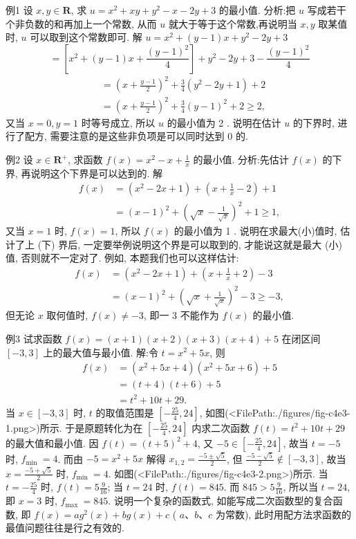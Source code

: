 例1 设 $x, y \in \mathbf{R}$, 求 $u=x^2+x y+y^2-x-2 y+3$ 的最小值.
分析:把 $u$ 写成若干个非负数的和再加上一个常数, 从而 $u$ 就大于等于这个常数,再说明当 $x, y$ 取某值时, $u$ 可以取到这个常数即可.
解 $u=x^2+(y-1) x+y^2-2 y+3$
$$
=\left[x^2+(y-1) x+\frac{(y-1)^2}{4}\right]+y^2-2 y+3-\frac{(y-1)^2}{4}
$$
$$
\begin{aligned}
& =\left(x+\frac{y-1}{2}\right)^2+\frac{3}{4}\left(y^2-2 y+1\right)+2 \\
& =\left(x+\frac{y-1}{2}\right)^2+\frac{3}{4}(y-1)^2+2 \geqslant 2,
\end{aligned}
$$
又当 $x=0, y=1$ 时等号成立, 所以 $u$ 的最小值为 2 .
说明在估计 $u$ 的下界时, 进行了配方, 需要注意的是这些非负项是可以同时达到 0 的.



例2 设 $x \in \mathbf{R}^{+}$, 求函数 $f(x)=x^2-x+\frac{1}{x}$ 的最小值.
分析:先估计 $f(x)$ 的下界, 再说明这个下界是可以达到的.
解
$$
\begin{aligned}
f(x) & =\left(x^2-2 x+1\right)+\left(x+\frac{1}{x}-2\right)+1 \\
& =(x-1)^2+\left(\sqrt{x}-\frac{1}{\sqrt{x}}\right)^2+1 \geqslant 1,
\end{aligned}
$$
又当 $x=1$ 时, $f(x)=1$, 所以 $f(x)$ 的最小值为 1 .
说明在求最大(小)值时, 估计了上 (下) 界后, 一定要举例说明这个界是可以取到的, 才能说这就是最大 (小) 值, 否则就不一定对了.
例如, 本题我们也可以这样估计:
$$
\begin{aligned}
f(x) & =\left(x^2-2 x+1\right)+\left(x+\frac{1}{x}+2\right)-3 \\
& =(x-1)^2+\left(\sqrt{x}+\frac{1}{\sqrt{x}}\right)^2-3 \geqslant-3,
\end{aligned}
$$
但无论 $x$ 取何值时, $f(x) \neq-3$, 即一 3 不能作为 $f(x)$ 的最小值.



例3 试求函数 $f(x)=(x+1)(x+2)(x+3)(x+4)+5$ 在闭区间 $[-3,3]$ 上的最大值与最小值.
解:令 $t=x^2+5 x$, 则
$$
\begin{aligned}
f(x) & =\left(x^2+5 x+4\right)\left(x^2+5 x+6\right)+5 \\
& =(t+4)(t+6)+5 \\
& =t^2+10 t+29 .
\end{aligned}
$$
当 $x \in[-3,3]$ 时, $t$ 的取值范围是 $\left[-\frac{25}{4}, 24\right]$, 如图(<FilePath:./figures/fig-c4e3-1.png>)所示.
于是原题转化为在 $\left[-\frac{25}{4}, 24\right]$ 内求二次函数 $f(t)=t^2+10 t+29$ 的最大值和最小值.
因 $f(t)=(t+5)^2+4$, 又 $-5 \in\left[-\frac{25}{4}, 24\right]$, 故当 $t=-5$ 时, $f_{\text {min }}=4$. 而由 $-5=x^2+5 x$ 解得 $x_{1,2}=\frac{-5 \pm \sqrt{5}}{2}$, 但 $\frac{-5-\sqrt{5}}{2} \notin[-3,3]$, 故当 $x= \frac{-5+\sqrt{5}}{2}$ 时, $f_{\text {min }}=4$. 如图(<FilePath:./figures/fig-c4e3-2.png>)所示.
当 $t=-\frac{25}{4}$ 时, $f(t)=5 \frac{9}{16}$; 当 $t=24$ 时, $f(t)=845$. 而 $845>5 \frac{9}{16}$, 所以当 $t=24$, 即 $x=3$ 时, $f_{\text {max }}=845$.
说明一个复杂的函数式, 如能写成二次函数型的复合函数, 即 $f(x)= a g^2(x)+b g(x)+c$ ( $a 、 b 、 c$ 为常数), 此时用配方法求函数的最值问题往往是行之有效的.



